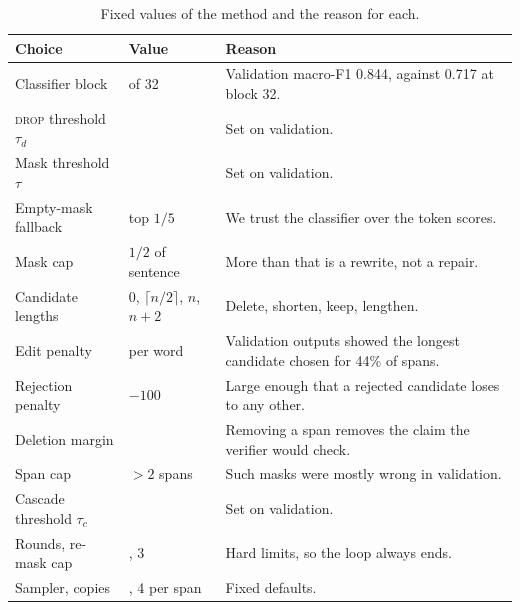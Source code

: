 \documentclass[11pt]{article}
\newcommand{\drop}{\textsc{drop}}
\begin{document}
\begin{table}[H]
    \centering
    \renewcommand{\arraystretch}{1.05}
    {\footnotesize
    \begin{tabular}{@{}>{\raggedright\arraybackslash}p{1.9cm}>{\raggedright\arraybackslash}p{1.5cm}>{\raggedright\arraybackslash}p{3.4cm}@{}}
    \toprule
    \textbf{Choice} & \textbf{Value} & \textbf{Reason} \\
    \midrule
    Classifier block & 24 of 32 & Validation macro-F1 0.844, against 0.717 at block 32. \\
    \hline
    \drop{} threshold $\tau_d$ & 0.8 & Set on validation. \\
    \hline
    Mask threshold $\tau$ & 0.85 & Set on validation. \\
    \hline
    Empty-mask fallback & top $1/5$ & We trust the classifier over the token scores. \\
    \hline
    Mask cap & $1/2$ of sentence & More than that is a rewrite, not a repair. \\
    \hline
    Candidate lengths & $0$, $\lceil n/2\rceil$, $n$, $n{+}2$ & Delete, shorten, keep, lengthen. \\
    \hline
    Edit penalty & 0.1 per word & Validation outputs showed the longest candidate chosen for 44\% of spans. \\
    \hline
    Rejection penalty & $-100$ & Large enough that a rejected candidate loses to any other. \\
    \hline
    Deletion margin & 0.1 & Removing a span removes the claim the verifier would check. \\
    \hline
    Span cap & $>2$ spans & Such masks were mostly wrong in validation. \\
    \hline
    Cascade threshold $\tau_c$ & 0.35 & Set on validation. \\
    \hline
    Rounds, re-mask cap & 3, 3 & Hard limits, so the loop always ends. \\
    \hline
    Sampler, copies & 8, 4 per span & Fixed defaults. \\
    \bottomrule
    \end{tabular}%
    }
    \caption{Fixed values of the method and the reason for each.}
    \label{tab:choices}
\end{table}
\end{document}
